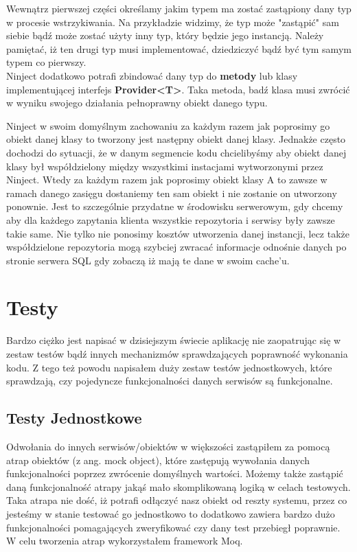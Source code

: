 Wewnątrz pierwszej części określamy jakim typem ma zostać zastąpiony dany typ w procesie wstrzykiwania. Na przykładzie widzimy, że typ może "zastąpić" sam siebie bądź może zostać użyty inny typ, który będzie jego instancją. Należy pamiętać, iż ten drugi typ musi implementować, dziedziczyć bądź być tym samym typem co pierwszy.
\\
Ninject dodatkowo potrafi zbindować dany typ do \textbf{metody} lub klasy implementującej interfejs \textbf{Provider<T>}. Taka metoda, badź klasa musi zwrócić w wyniku swojego działania pełnoprawny obiekt danego typu.


Ninject w swoim domyślnym zachowaniu za każdym razem jak poprosimy go obiekt danej klasy to tworzony jest następny obiekt danej klasy. Jednakże często dochodzi do sytuacji, że w danym segmencie kodu chcielibyśmy aby obiekt danej klasy był współdzielony między wszystkimi instacjami wytworzonymi przez Ninject. Wtedy za każdym razem jak poprosimy obiekt klasy A to zawsze w ramach danego zasięgu dostaniemy ten sam obiekt i nie zostanie on utworzony ponownie.
Jest to szczególnie przydatne w środowisku serwerowym, gdy chcemy aby dla każdego zapytania klienta wszystkie repozytoria i serwisy były zawsze takie same. Nie tylko nie ponosimy kosztów utworzenia danej instancji, lecz także współdzielone repozytoria mogą szybciej zwracać informacje odnośnie danych po stronie serwera SQL gdy zobaczą iż mają te dane w swoim cache'u.

\newpage
{\let\cleardoublepage\relax \chapter{Testy}}

Bardzo ciężko jest napisać w dzisiejszym świecie aplikację nie zaopatrując się w zestaw testów bądź innych mechanizmów sprawdzających poprawność wykonania kodu. Z tego też powodu napisałem duży zestaw testów jednostkowych, które sprawdzają, czy pojedyncze funkcjonalności danych serwisów są funkcjonalne. 

\section{Testy Jednostkowe}

Odwołania do innych serwisów/obiektów w większości zastąpiłem za pomocą atrap obiektów (z ang. mock object), które zastępują wywołania danych funkcjonalności poprzez zwrócenie domyślnych wartości. Możemy także zastąpić daną funkcjonalność atrapy jakąś mało skomplikowaną logiką w celach testowych. Taka atrapa nie dość, iż potrafi odłączyć nasz obiekt od reszty systemu, przez co jesteśmy w stanie testować go jednostkowo to dodatkowo zawiera bardzo dużo funkcjonalności pomagających zweryfikować czy dany test przebiegł poprawnie. W celu tworzenia atrap wykorzystałem framework Moq\cite{MoqGithub}.



